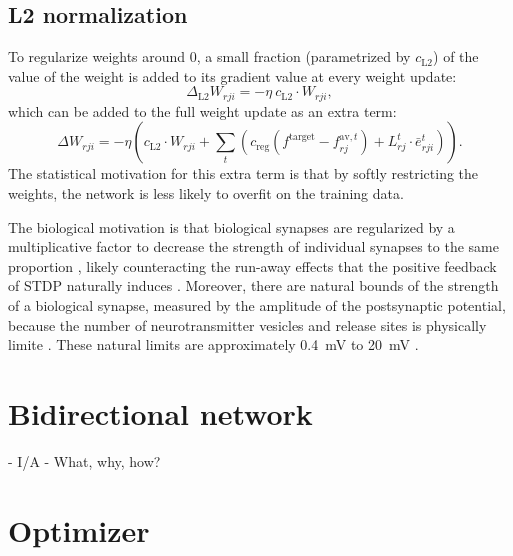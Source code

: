 	\subsection{L2 normalization}
		To regularize weights around 0, a small fraction (parametrized by $c_\text{L2}$) of the value of the weight is added to its gradient value at every weight update:
		\begin{equation}
		\Delta_\text{L2} W_{rji} = -\eta\ c_\text{L2} \cdot W_{rji},
		\end{equation}
		which can be added to the full weight update as an extra term:
		\begin{equation}
		\Delta W_{rji} = -\eta\left(c_\text{L2} \cdot W_{rji} + \sum_t\left(c_\text{reg}\left(f^\text{target} - f^{\text{av}, t}_{rj}\right) + L^t_{rj}\cdot\bar{e}^t_{rji}\right)\right).
		\end{equation}
		The statistical motivation for this extra term is that by softly restricting the weights, the network is less likely to overfit on the training data.

		The biological motivation is that biological synapses are regularized by a multiplicative factor to decrease the strength of individual synapses to the same proportion \citep{turrigiano2000hebb}, likely counteracting the run-away effects that the positive feedback of STDP naturally induces \citep{siddoway2014molecular}.
		Moreover, there are natural bounds of the strength of a biological synapse, measured by the amplitude of the postsynaptic potential, because the number of neurotransmitter vesicles and release sites is physically limite \citep{del1954quantal}.
		These natural limits are approximately \SI{0.4}{\mV} to \SI{20}{\mV} \citep{diaz2006target}.


\section{Bidirectional network}
	\begin{tcolorbox}[colback=orange]
	- I/A
	- What, why, how?

	\end{tcolorbox}

\section{Optimizer}\label{sec:adam}

